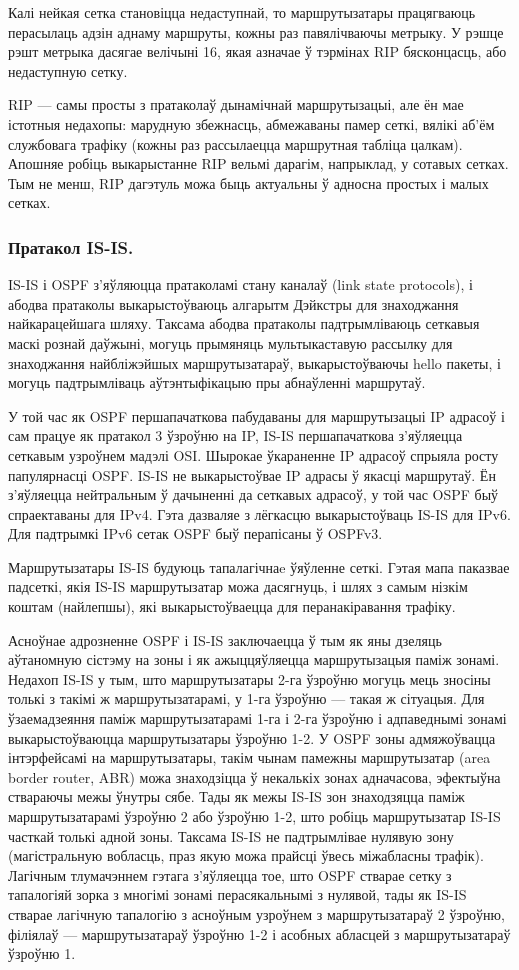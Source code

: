 Калі нейкая сетка становіцца недаступнай, то маршрутызатары працягваюць перасылаць адзін аднаму маршруты, кожны раз павялічваючы метрыку. У рэшце рэшт метрыка дасягае велічыні 16, якая азначае ў тэрмінах RIP бясконцасць, або недаступную сетку.

RIP --- самы просты з пратаколаў дынамічнай маршрутызацыі, але ён мае істотныя недахопы: марудную збежнасць, абмежаваны памер сеткі, вялікі аб'ём службовага трафіку (кожны раз рассылаецца маршрутная табліца цалкам). Апошняе робіць выкарыстанне RIP вельмі дарагім, напрыклад, у сотавых сетках. Тым не менш, RIP дагэтуль можа быць актуальны ў адносна простых і малых сетках.

\subsubsection{Пратакол IS-IS.}
IS-IS і OSPF з'яўляюцца пратаколамі стану каналаў (link state protocols), і абодва пратаколы выкарыстоўваюць алгарытм Дэйкстры для знаходжання найкарацейшага шляху. Таксама абодва пратаколы падтрымліваюць сеткавыя маскі рознай даўжыні, могуць прымяняць мультыкаставую рассылку для знаходжання найбліжэйшых маршрутызатараў, выкарыстоўваючы hello пакеты, і могуць падтрымліваць аўтэнтыфікацыю пры абнаўленні маршрутаў.

У той час як OSPF першапачаткова пабудаваны для маршрутызацыі IP адрасоў і сам працуе як пратакол 3 ўзроўню на IP, IS-IS першапачаткова з'яўляецца сеткавым узроўнем мадэлі OSI. Шырокае ўкараненне IP адрасоў спрыяла росту папулярнасці OSPF. IS-IS не выкарыстоўвае IP адрасы ў якасці маршрутаў. Ён з'яўляецца нейтральным ў дачыненні да сеткавых адрасоў, у той час OSPF быў спраектаваны для IPv4. Гэта дазваляе з лёгкасцю выкарыстоўваць IS-IS для IPv6. Для падтрымкі IPv6 сетак OSPF быў перапісаны ў OSPFv3.

Маршрутызатары IS-IS будуюць тапалагічнаe ўяўленне сеткі. Гэтая мапа паказвае падсеткі, якія IS-IS маршрутызатар можа дасягнуць, і шлях з самым нізкім коштам (найлепшы), які выкарыстоўваецца для перанакіравання трафіку.

Асноўнае адрозненне OSPF і IS-IS заключаецца ў тым як яны дзеляць аўтаномную сістэму на зоны і як ажыццяўляецца маршрутызацыя паміж зонамі. Недахоп IS-IS у тым, што маршрутызатары 2-га ўзроўню могуць мець зносіны толькі з такімі ж маршрутызатарамі, у 1-га ўзроўню --- такая ж сітуацыя. Для ўзаемадзеяння паміж маршрутызатарамі 1-га і 2-га ўзроўню і адпаведнымі зонамі выкарыстоўваюцца маршрутызатары ўзроўню 1-2. У OSPF зоны адмяжоўвацца інтэрфейсамі на маршрутызатары, такім чынам памежны маршрутызатар (area border router, ABR) можа знаходзіцца ў некалькіх зонах адначасова, эфектыўна ствараючы межы ўнутры сябе. Тады як межы IS-IS зон знаходзяцца паміж маршрутызатарамі ўзроўню 2 або ўзроўню 1-2, што робіць маршрутызатар IS-IS часткай толькі адной зоны. Таксама IS-IS не падтрымлівае нулявую зону (магістральную вобласць, праз якую можа прайсці ўвесь міжабласны трафік). Лагічным тлумачэннем гэтага з'яўляецца тое, што OSPF стварае сетку з тапалогіяй зорка з многімі зонамі перасякальнымі з нулявой, тады як IS-IS стварае лагічную тапалогію з асноўным узроўнем з маршрутызатараў 2 ўзроўню, філіялаў --- маршрутызатараў ўзроўню 1-2 і асобных абласцей з маршрутызатараў ўзроўню 1.

